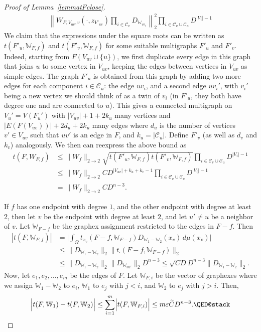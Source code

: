 \documentclass{amsart}
\numberwithin{equation}{section}
\numberwithin{figure}{section}
\theoremstyle{definition}
\theoremstyle{remark}
\newcommand{\eps}{\varepsilon}
\newcommand{\cW}{\mathbb{W}}
\newcommand{\cC}{\mathcal{C}}
\begin{document}
\begin{proof}[Proof of Lemma~\ref{lemmatFclose}]
\begin{align*}
{\left\|W_{F,V_{uv},v}({\cdot},z_{V'_{uv}})
\prod_{i \in \cC_v} D_{\cW_{vv_i}}\right\|_2^2}
\prod_{i\in \cC_v\cup\cC_u} D^{|V_i|-1}
\end{align*}
We claim that the expressions under the square roots can be written as
$t(F'_u,\cW_{F,f})$ and $t(F'_v,\cW_{F,f})$ for some suitable multigraphs
$F'_u$ and $F'_v$. Indeed, starting from $F(V_{uv}\cup\{u\})$, we first
duplicate every edge in this graph that joins $u$ to some vertex in $V_{uv}$,
keeping the edges between vertices in $V_{uv}$ as simple edges. The graph
$F'_u$ is obtained from this graph by adding two more edges for each
component $i\in\cC_u$: the edge $uv_i$, and a second edge $uv_i'$, with
$v_i'$ being a new vertex we should think of as a twin of $v_i$ (in $F'_u$,
they both have degree one and are connected to $u$). This gives a connected
multigraph on $V_u'=V(F_u')$ with $|V_{uv}|+1+2k_u$ many vertices and
$|E(F(V_{uv}))|+2d_u+2k_u$ many edges where $d_u$ is the number of vertices
$v'\in V_{uv}$ such that $uv'$ is an edge in $F$, and $k_u=|\cC_u|$. Define
$F'_v$ (as well as $d_v$ and $k_v$) analogously. We then can reexpress the
above bound as
\begin{align*}
t(F,W_{F,f})&\le
\|W_f\|_{2 \rightarrow 2}
\sqrt{t(F'_u,\cW_{F,f})t(F'_v,\cW_{F,f})}
\prod_{i\in \cC_v\cup\cC_u} D^{|V_i|-1}
\\
&\le
\|W_f\|_{2 \rightarrow 2}C D^{|V_{uv}|+k_u+k_v-1}
\prod_{i\in \cC_v\cup\cC_u} D^{|V_i|-1}
\\
&=\|W_f\|_{2 \rightarrow 2}C
D^{n-3}.
\end{align*}

If $f$ has one endpoint with degree $1$, and the other endpoint with degree
at least $2$, then let $v$ be the endpoint with degree at least $2$, and let
$u'\neq u$ be a neighbor of $v$. Let $\cW_{F-f}$ be the graphex assignment
restricted to the edges in $F-f$. Then
\begin{align*}
|t(F,\cW_{F,f})|&=\bigg|\int_{\Omega} t_{x_v}(F-f,\cW_{F-f})D_{{\cW_1-\cW_2}}(x_v)\,d\mu(x_v)\bigg|\\
& \le \|D_{\cW_1-\cW_2}\|_2 \|t_{\cdot}(F-f,\cW_{F-f})\|_2
\\
&\leq \|D_{\cW_1-\cW_2}\|_2\|D_{\cW_{vu'}}\|_2D^{n-3}
\leq \sqrt {CD}D^{n-3}
\|D_{\cW_1-\cW_2}\|_2.
\end{align*}
Now, let $e_1,e_2,\dots,e_m$ be the edges of $F$. Let $\cW_{F,i}$ be the
vector of graphexes where we assign $\cW_1-\cW_2$ to $e_i$, $\cW_1$ to $e_j$
with $j<i$, and $\cW_2$ to $e_j$ with $j>i$. Then,
\[
\Bigl|t(F,\cW_1)-t(F,\cW_2)\Bigr|\leq
\sum_{i=1}^m \Bigl|t(F,\cW_{F,i})\Bigr|
\le m\eps\widetilde CD^{n-3}
. \qedhere\]
\end{proof}
\end{document}
